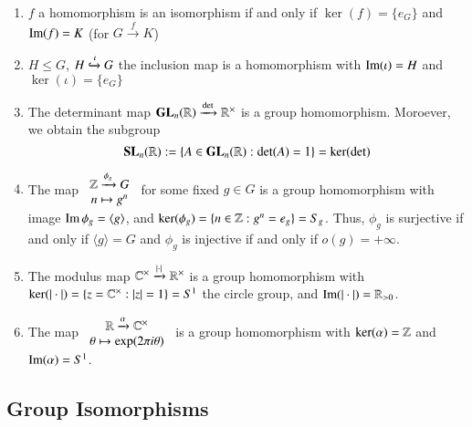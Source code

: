 \begin{example}
        \leavevmode
        \begin{enumerate}
                \item $f$ a homomorphism is an isomorphism if and only if $\ker(f) = \{e_G\}$ and $\operatorname{Im}(f) = K$ (for $G\xrightarrow{f} K$)
                \item $H \leq G$, $H \xhookrightarrow{\iota} G$ the inclusion map is a homomorphism with $\operatorname{Im}(\iota) = H$ and $\ker(\iota) = \{e_G\}$
                \item The determinant map $\mathbf{GL}_n(\mathbb R)\xrightarrow{\det}\mathbb R^{\times}$ is a group homomorphism. Moroever, we obtain the subgroup \begin{equation}
                                \mathbf{SL}_n(\mathbb R) := \{A \in \mathbf{GL}_n(\mathbb R):\det(A) = 1\} = \ker(\det)
                        \end{equation}
                \item The map $\begin{array}{c} \mathbb Z\xrightarrow{\phi_g} G \\ n \mapsto g^n \end{array}$ for some fixed $g \in G$ is a group homomorphism with image $\operatorname{Im} \phi_g = \langle g \rangle$, and $\ker(\phi_g) = \{n \in \mathbb Z:g^n = e_g\} = S_g$. Thus, $\phi_g$ is surjective if and only if $\langle g\rangle = G$ and $\phi_g$ is injective if and only if $o(g) = +\infty$.
                \item The modulus map $\mathbb C^{\times} \xrightarrow{|\cdot|}\mathbb R^{\times}$ is a group homomorphism with $\ker(|\cdot|) = \{z = \mathbb C^{\times}:|z| = 1\} = S^1$ the circle group, and $\operatorname{Im}(|\cdot|) = \mathbb R_{>0}$.
                \item The map $\begin{array}{c} \mathbb R\xrightarrow{\alpha}\mathbb C^{\times} \\ \theta\mapsto \exp(2\pi i \theta) \end{array}$ is a group homomorphism with $\ker(\alpha) = \mathbb Z$ and $\operatorname{Im}(\alpha) = S^1$.
        \end{enumerate}
\end{example}




\subsection{ Group Isomorphisms}

